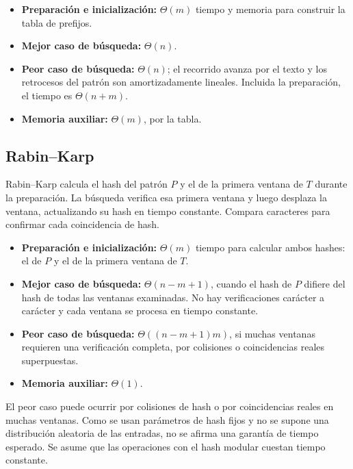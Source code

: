 \begin{itemize}
    \item \textbf{Preparación e inicialización:} \(\Theta(m)\) tiempo y
    memoria para construir la tabla de prefijos.
    \item \textbf{Mejor caso de búsqueda:} \(\Theta(n)\).
    \item \textbf{Peor caso de búsqueda:} \(\Theta(n)\); el recorrido avanza por
    el texto y los retrocesos del patrón son amortizadamente lineales.
    Incluida la preparación, el tiempo es \(\Theta(n+m)\).
    \item \textbf{Memoria auxiliar:} \(\Theta(m)\), por la tabla.
\end{itemize}

\subsection{Rabin--Karp}

Rabin--Karp calcula el hash del patrón \(P\) y el de la primera ventana de
\(T\) durante la preparación. La búsqueda verifica esa primera ventana y luego
desplaza la ventana, actualizando su hash en tiempo constante. Compara
caracteres para confirmar cada coincidencia de hash.

\begin{itemize}
    \item \textbf{Preparación e inicialización:} \(\Theta(m)\) tiempo para
    calcular ambos hashes: el de \(P\) y el de la primera ventana de \(T\).
    \item \textbf{Mejor caso de búsqueda:} \(\Theta(n - m + 1)\), cuando el
    hash de \(P\) difiere del hash de todas las ventanas examinadas. No hay
    verificaciones carácter a carácter y cada ventana se procesa en tiempo
    constante.
    \item \textbf{Peor caso de búsqueda:} \(\Theta((n - m + 1)m)\), si muchas
    ventanas requieren una verificación completa, por colisiones o coincidencias
    reales superpuestas.
    \item \textbf{Memoria auxiliar:} \(\Theta(1)\).
\end{itemize}

El peor caso puede ocurrir por colisiones de hash o por coincidencias reales en
muchas ventanas. Como se usan parámetros de hash fijos y no se supone una
distribución aleatoria de las entradas, no se afirma una garantía de tiempo
esperado. Se asume que las operaciones con el hash modular cuestan tiempo
constante.

